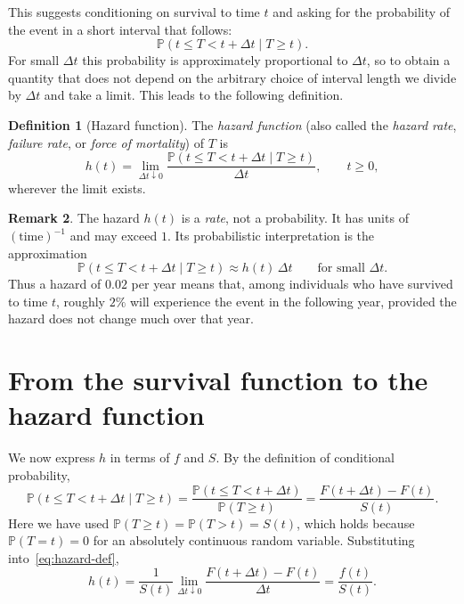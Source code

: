 \documentclass[11pt]{article}
\theoremstyle{definition}
\newtheorem{definition}{Definition}[section]
\newtheorem{remark}[definition]{Remark}
\theoremstyle{plain}
\newcommand{\Prob}{\mathbb{P}}
\begin{document}
This suggests conditioning on survival to time $t$ and asking for the probability of the event in a short interval that follows:
\begin{equation}\label{eq:cond-prob}
  \Prob(t \le T < t + \Delta t \mid T \ge t).
\end{equation}
For small $\Delta t$ this probability is approximately proportional to $\Delta t$, so to obtain a quantity that does not depend on the arbitrary choice of interval length we divide by $\Delta t$ and take a limit. This leads to the following definition.

\begin{definition}[Hazard function]\label{def:hazard}
The \emph{hazard function} (also called the \emph{hazard rate}, \emph{failure rate}, or \emph{force of mortality}) of $T$ is
\begin{equation}\label{eq:hazard-def}
  h(t) = \lim_{\Delta t \downarrow 0}
  \frac{\Prob(t \le T < t + \Delta t \mid T \ge t)}{\Delta t},
  \qquad t \ge 0,
\end{equation}
wherever the limit exists.
\end{definition}

\begin{remark}\label{rem:not-probability}
The hazard $h(t)$ is a \emph{rate}, not a probability. It has units of $(\text{time})^{-1}$ and may exceed $1$. Its probabilistic interpretation is the approximation
\[
  \Prob(t \le T < t + \Delta t \mid T \ge t) \approx h(t)\,\Delta t
  \qquad \text{for small } \Delta t.
\]
Thus a hazard of $0.02$ per year means that, among individuals who have survived to time $t$, roughly $2\%$ will experience the event in the following year, provided the hazard does not change much over that year.
\end{remark}

\section{From the survival function to the hazard function}\label{sec:s-to-h}

We now express $h$ in terms of $f$ and $S$. By the definition of conditional probability,
\[
  \Prob(t \le T < t + \Delta t \mid T \ge t)
  = \frac{\Prob(t \le T < t + \Delta t)}{\Prob(T \ge t)}
  = \frac{F(t + \Delta t) - F(t)}{S(t)}.
\]
Here we have used $\Prob(T \ge t) = \Prob(T > t) = S(t)$, which holds because $\Prob(T = t) = 0$ for an absolutely continuous random variable. Substituting into~\eqref{eq:hazard-def},
\[
  h(t) = \frac{1}{S(t)} \lim_{\Delta t \downarrow 0}
  \frac{F(t + \Delta t) - F(t)}{\Delta t}
  = \frac{f(t)}{S(t)}.
\]
\end{document}
